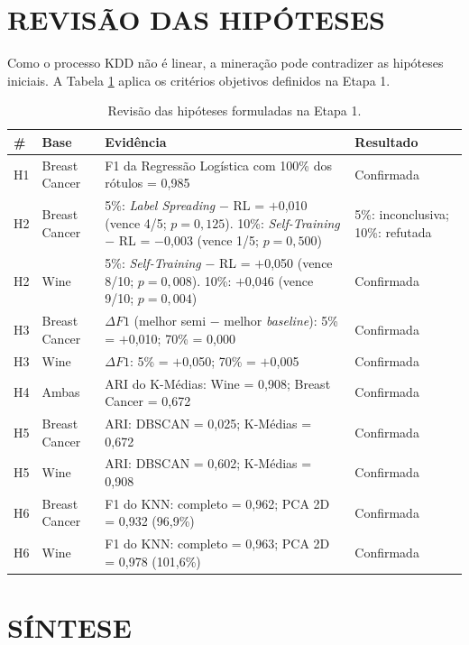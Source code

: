 \section{REVISÃO DAS HIPÓTESES}

Como o processo KDD não é linear, a mineração pode contradizer as hipóteses iniciais. A Tabela \ref{tab:veredito} aplica os critérios objetivos definidos na Etapa 1.

\begin{table}[htbp]
\centering
\caption{Revisão das hipóteses formuladas na Etapa 1.}
\label{tab:veredito}
\footnotesize
\begin{tabular}{p{0.6cm} p{2.4cm} p{8.4cm} p{2.6cm}}
\toprule
\textbf{\#} & \textbf{Base} & \textbf{Evidência} & \textbf{Resultado} \\
\midrule
H1 & Breast Cancer & F1 da Regressão Logística com 100\% dos rótulos = 0,985 & Confirmada \\
\addlinespace
H2 & Breast Cancer & 5\%: \textit{Label Spreading} $-$ RL = $+$0,010 (vence 4/5; $p = 0{,}125$). 10\%: \textit{Self-Training} $-$ RL = $-$0,003 (vence 1/5; $p = 0{,}500$) & 5\%: inconclusiva; 10\%: refutada \\
\addlinespace
H2 & Wine & 5\%: \textit{Self-Training} $-$ RL = $+$0,050 (vence 8/10; $p = 0{,}008$). 10\%: $+$0,046 (vence 9/10; $p = 0{,}004$) & Confirmada \\
\addlinespace
H3 & Breast Cancer & $\Delta F1$ (melhor semi $-$ melhor \textit{baseline}): 5\% = $+$0,010; 70\% = 0,000 & Confirmada \\
\addlinespace
H3 & Wine & $\Delta F1$: 5\% = $+$0,050; 70\% = $+$0,005 & Confirmada \\
\addlinespace
H4 & Ambas & ARI do K-Médias: Wine = 0,908; Breast Cancer = 0,672 & Confirmada \\
\addlinespace
H5 & Breast Cancer & ARI: DBSCAN = 0,025; K-Médias = 0,672 & Confirmada \\
\addlinespace
H5 & Wine & ARI: DBSCAN = 0,602; K-Médias = 0,908 & Confirmada \\
\addlinespace
H6 & Breast Cancer & F1 do KNN: completo = 0,962; PCA 2D = 0,932 (96,9\%) & Confirmada \\
\addlinespace
H6 & Wine & F1 do KNN: completo = 0,963; PCA 2D = 0,978 (101,6\%) & Confirmada \\
\bottomrule
\end{tabular}
\end{table}

\section{SÍNTESE}

